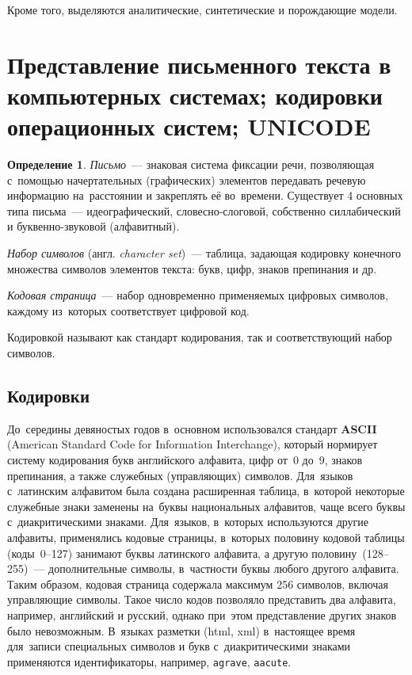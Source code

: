 \documentclass[12pt]{article}
\theoremstyle{definition}
\newtheorem*{defn}{Определение}
\theoremstyle{remark}
\numberwithin{equation}{section}
\begin{document}
Кроме того, выделяются аналитические, синтетические и порождающие модели.

\section{Представление письменного текста в компьютерных системах; кодировки операционных систем; UNICODE}
\begin{defn}
\textsl{Письмо}~--- знаковая система фиксации речи, позволяющая с~помощью
начертательных (графических) элементов передавать речевую информацию
на~расстоянии и закреплять её во~времени. Существует 4 основных типа
письма~--- идеографический, словесно-слоговой, собственно силлабический
и буквенно-звуковой (алфавитный).

{\sl Набор символов} (англ. {\sl character set})~--- таблица, задающая
кодировку конечного множества символов элементов текста: букв, цифр,
знаков препинания и др.

{\sl Кодовая страница}~--- набор одновременно применяемых цифровых символов,
каждому из~которых соответствует цифровой код.
\end{defn}

Кодировкой называют как стандарт кодирования, так и соответствующий набор
символов.

\subsection{Кодировки}
До~середины девяностых годов в~основном использовался стандарт \textbf{ASCII}
(American Standard Code for Information Interchange), который нормирует систему
кодирования букв английского алфавита, цифр от~0 до~9, знаков препинания, а также
служебных (управляющих) символов. Для~языков с~латинским алфавитом была создана
расширенная таблица, в~которой некоторые служебные знаки заменены на~буквы
национальных алфавитов, чаще всего буквы с~диакритическими знаками. Для~языков,
в~которых используются другие алфавиты, применялись кодовые страницы, в~которых
половину кодовой таблицы (коды~0--127) занимают буквы латинского алфавита,
а другую половину~(128--255)~--- дополнительные символы, в~частности буквы любого
другого алфавита. Таким образом, кодовая страница содержала максимум 256 символов,
включая управляющие символы. Такое число кодов позволяло представить два алфавита,
например, английский и русский, однако при~этом представление других знаков
было невозможным. В~языках разметки (html, xml) в~настоящее время для~записи
специальных символов и букв с~диакритическими знаками применяются идентификаторы,
например, \texttt{agrave}, \texttt{aacute}.
\end{document}
